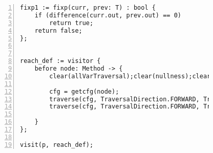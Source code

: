 \begin{figure}[ht!]
\begin{lstlisting}[numbers=left, tabsize=4, escapechar=@, caption={Nullness Analysis},label={lst:na-code}, lastline = 59]
fixp1 := fixp(curr, prev: T) : bool {
	if (difference(curr.out, prev.out) == 0)
		return true;	
	return false;
};


reach_def := visitor {
	before node: Method -> {
		clear(allVarTraversal);clear(nullness);clear(local);

		cfg = getcfg(node);
		traverse(cfg, TraversalDirection.FORWARD, TraversalKind.HYBRID, allVarTraversal);
		traverse(cfg, TraversalDirection.FORWARD, TraversalKind.HYBRID, nullness, fixp1);
			
	}
};

visit(p, reach_def);
\end{lstlisting}
\end{figure}